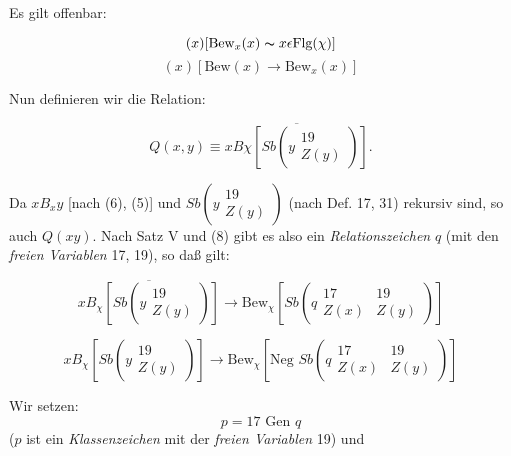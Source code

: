 \documentclass[draft]{scrartcl}
\begin{document}
Es gilt offenbar:

\begin{equation}
	\left(x\right) \left[\text{Bew}_x\left(x\right) \thicksim x \epsilon \text{Flg}\left(\chi\right)\right]
\end{equation}
\begin{equation}
	\left(x\right) \left[\text{Bew}\left(x\right) \longrightarrow \text{Bew}_x\left(x\right)\right]
\end{equation}

Nun definieren wir die Relation:

\begin{equation}
	\tag{8.1}
	Q\left(x, y\right) \equiv \overline{x B\chi\left[ Sb\left(y\substack{19\\ Z\left(y\right)}\right)\right]}.
\end{equation}

Da $x B_x y$ [nach (6), (5)] und $Sb\left(y\substack{19\\ Z\left(y\right)}\right)$ (nach Def. 17, 31) rekursiv sind, so auch $Q\left(xy\right)$. Nach Satz V und (8) gibt es also ein \textit{Relationszeichen} $q$ (mit den \textit{freien Variablen} 17, 19), so daß gilt:

\begin{equation}
	\overline{x B_\chi\left[Sb\left(y\substack{19\\ Z\left(y\right)}\right)\right]} \longrightarrow \text{Bew}_{\chi} \left[Sb \left(q \substack{17\\ Z\left(x\right)}\substack{19\\ Z\left(y\right)}\right)\right]
\end{equation}

\begin{equation}
	x B_\chi \left[Sb\left(y\substack{19\\ Z\left(y\right)}\right)\right] \longrightarrow \text{Bew}_\chi \left[\text{Neg }Sb\left(q\substack{17\\ Z\left(x\right)}\substack{19\\ Z\left(y\right)}\right)\right]
\end{equation}

Wir setzen:
\begin{equation}
	p = 17 \text{ Gen } q
\end{equation}
($p$ ist ein \textit{Klassenzeichen} mit der \textit{freien Variablen} 19) und
\end{document}
